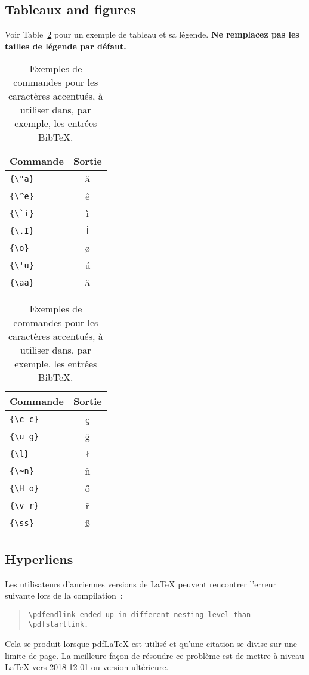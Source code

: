 \documentclass[11pt,french]{article}
\begin{document}
\subsection{Tableaux and figures}

Voir Table~\ref{tab:accents} pour un exemple de tableau et sa légende.
\textbf{Ne remplacez pas les tailles de légende par défaut.}

\begin{table}
\centering
\begin{tabular}{lc}
\hline
\textbf{Commande} & \textbf{Sortie}\\
\hline
\verb|{\"a}| & {\"a} \\
\verb|{\^e}| & {\^e} \\
\verb|{\`i}| & {\`i} \\ 
\verb|{\.I}| & {\.I} \\ 
\verb|{\o}| & {\o} \\
\verb|{\'u}| & {\'u}  \\ 
\verb|{\aa}| & {\aa}  \\\hline
\end{tabular}
\begin{tabular}{lc}
\hline
\textbf{Commande} & \textbf{Sortie}\\
\hline
\verb|{\c c}| & {\c c} \\ 
\verb|{\u g}| & {\u g} \\ 
\verb|{\l}| & {\l} \\ 
\verb|{\~n}| & {\~n} \\ 
\verb|{\H o}| & {\H o} \\ 
\verb|{\v r}| & {\v r} \\ 
\verb|{\ss}| & {\ss} \\
\hline
\end{tabular}
\caption{Exemples de commandes pour les caractères accentués, à utiliser dans, par exemple, les entrées Bib\TeX{}.}
\label{tab:accents}
\end{table}

\subsection{Hyperliens}

Les utilisateurs d'anciennes versions de \LaTeX{} peuvent rencontrer l'erreur suivante lors de la compilation :
\begin{quote}
\tt\verb|\pdfendlink| ended up in different nesting level than \verb|\pdfstartlink|.
\end{quote}
Cela se produit lorsque pdf\LaTeX{} est utilisé et qu'une citation se divise sur une limite de page. La meilleure façon de résoudre ce problème est de mettre à niveau \LaTeX{} vers 2018-12-01 ou version ultérieure.
\end{document}

